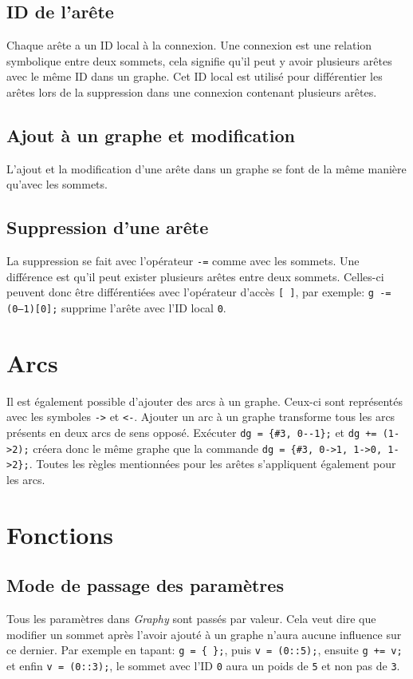 \documentclass[french]{article}
\begin{document}
		\subsection{ID de l'arête}
		Chaque arête a un ID local à la connexion. Une connexion est une relation symbolique entre deux sommets, cela signifie qu'il peut y avoir plusieurs arêtes avec le même ID dans un graphe. Cet ID local est utilisé pour différentier les arêtes lors de la suppression dans une connexion contenant plusieurs arêtes.
	
		\subsection{Ajout à un graphe et modification}
		L'ajout et la modification d'une arête dans un graphe se font de la même manière qu'avec les sommets.
		
		\subsection{Suppression d'une arête}
		La suppression se fait avec l'opérateur \texttt{-=} comme avec les sommets. Une différence est qu'il peut exister plusieurs arêtes entre deux sommets. Celles-ci peuvent donc être différentiées avec l'opérateur d'accès \texttt{[ ]}, par exemple: \texttt{g -= (0--1)[0];} supprime l'arête avec l'ID local \texttt{0}.
		
	\section{Arcs}
	Il est également possible d'ajouter des arcs à un graphe. Ceux-ci sont représentés avec les symboles \texttt{->} et \texttt{<-}. Ajouter un arc à un graphe transforme tous les arcs présents en deux arcs de sens opposé. Exécuter \texttt{dg = \{\#3, 0-{}-1\};} et \texttt{dg += (1->2);} créera donc le même graphe que la commande \texttt{dg = \{\#3, 0->1, 1->0, 1->2\};}. Toutes les règles mentionnées pour les arêtes s'appliquent également pour les arcs.
	
	\section{Fonctions}
		\subsection{Mode de passage des paramètres}
		Tous les paramètres dans \textit{Graphy} sont passés par valeur. Cela veut dire que modifier un sommet après l'avoir ajouté à un graphe n'aura aucune influence sur ce dernier. Par exemple en tapant: \texttt{g = \{ \};}, puis \texttt{v = (0::5);}, ensuite \texttt{g += v;} et enfin \texttt{v = (0::3);}, le sommet avec l'ID \texttt{0} aura un poids de \texttt{5} et non pas de \texttt{3}.
		
\end{document}
